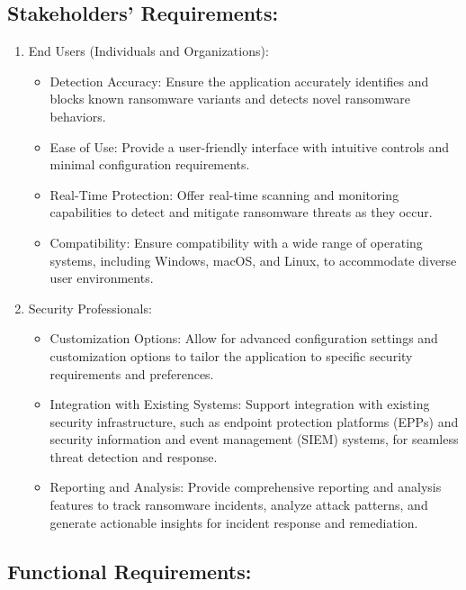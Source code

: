 \documentclass[12pt,twocolumn]{article}
\begin{document}
\subsection{Stakeholders' Requirements:}
    \begin{enumerate}[label=\arabic*.]
    \item End Users (Individuals and Organizations):
        \begin{itemize} 
            \item Detection Accuracy: Ensure the application accurately identifies and blocks known ransomware variants and detects novel ransomware behaviors. 
            \item Ease of Use: Provide a user-friendly interface with intuitive controls and minimal configuration requirements.
            \item Real-Time Protection: Offer real-time scanning and monitoring capabilities to detect and mitigate ransomware threats as they occur.
            \item Compatibility: Ensure compatibility with a wide range of operating systems, including Windows, macOS, and Linux, to accommodate diverse user environments.
        \end{itemize}

        \item Security Professionals:
        \begin{itemize}
            \item Customization Options: Allow for advanced configuration settings and customization options to tailor the application to specific security requirements and preferences.
            \item Integration with Existing Systems: Support integration with existing security infrastructure, such as endpoint protection platforms (EPPs) and security information and event management (SIEM) systems, for seamless threat detection and response.
            \item Reporting and Analysis: Provide comprehensive reporting and analysis features to track ransomware incidents, analyze attack patterns, and generate actionable insights for incident response and remediation.
        \end{itemize}
    \end{enumerate}

    
\subsection{Functional Requirements:}
\end{document}
